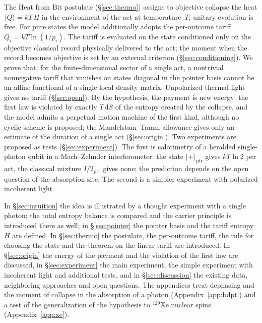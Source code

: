 \documentclass[11pt,a4paper]{article}
\newcommand{\Sref}[1]{\hyperref[#1]{\S\ref{#1}}}
\begin{document}
The Heat from Bit postulate (\Sref{sec:thermo}) assigns to objective collapse the heat $\langle Q\rangle=kT\,H$ in the environment of the act at temperature~$T$; unitary evolution is free. For pure states the model additionally adopts the per-outcome tariff $Q_i=kT\ln(1/p_i)$. The tariff is evaluated on the state conditioned only on the objective classical record physically delivered to the act; the moment when the record becomes objective is set by an external criterion (\Sref{sec:conditioning}). We prove that, for the finite-dimensional sector of a single act, a nontrivial nonnegative tariff that vanishes on states diagonal in the pointer basis cannot be an affine functional of a single local density matrix. Unpolarized thermal light gives no tariff (\Sref{sec:open}). By the hypothesis, the payment is new energy: the first law is violated by exactly $T\,\mathrm{d}S$ of the entropy created by the collapse, and the model admits a perpetual motion machine of the first kind, although no cyclic scheme is proposed; the Mandelstam--Tamm allowance gives only an estimate of the duration of a single act (\Sref{sec:origin}). Two experiments are proposed as tests (\Sref{sec:experiment}). The first is calorimetry of a heralded single-photon qubit in a Mach--Zehnder interferometer: the state $|{+}\rangle_{\mathrm{ptr}}$ gives $kT\ln 2$ per act, the classical mixture $I/2_{\mathrm{ptr}}$ gives none; the prediction depends on the open question of the absorption site. The second is a simpler experiment with polarized incoherent light.

In \Sref{sec:intuition} the idea is illustrated by a thought experiment with a single photon; the total entropy balance is compared and the carrier principle is introduced there as well; in \Sref{sec:pointer} the pointer basis and the tariff entropy~$H$ are defined. In \Sref{sec:thermo} the postulate, the per-outcome tariff, the rule for choosing the state and the theorem on the linear tariff are introduced. In \Sref{sec:origin} the energy of the payment and the violation of the first law are discussed, in \Sref{sec:experiment} the main experiment, the simple experiment with incoherent light and additional tests, and in \Sref{sec:discussion} the existing data, neighboring approaches and open questions. The appendices treat dephasing and the moment of collapse in the absorption of a photon (Appendix~\ref{app:bdpt}) and a test of the generalization of the hypothesis to $^{129}$Xe nuclear spins (Appendix~\ref{app:xe}).

\end{document}
